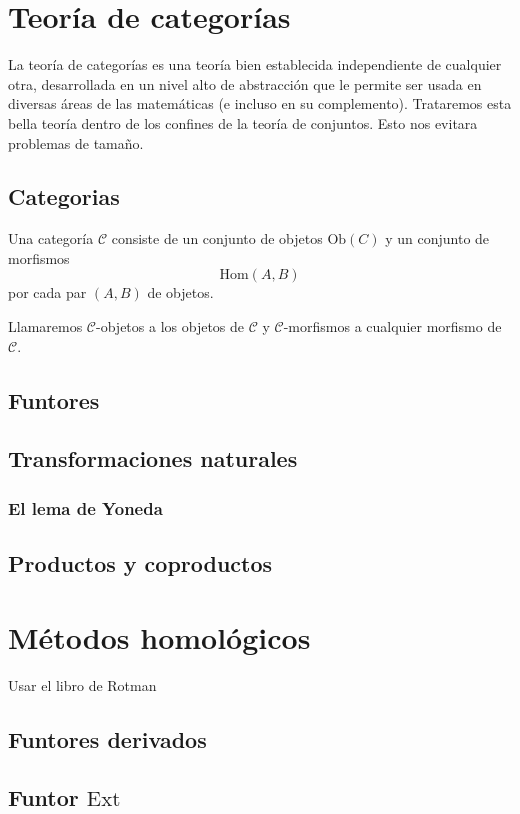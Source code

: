 \documentclass[b5paper,10pt]{book}
\begin{document}
\chapter{Teoría de categorías}

La teoría de categorías 
es una teoría bien establecida 
independiente de cualquier otra,
desarrollada en un nivel alto de abstracción
que le permite ser usada en diversas áreas 
de las matemáticas (e incluso en su complemento).
Trataremos esta bella teoría dentro de los confines
de la teoría de conjuntos.
Esto nos evitara problemas de tamaño.

\section{Categorias}

\begin{defi}
Una categoría \(\mathcal{C}\) consiste de un conjunto de objetos
\(\mathrm{Ob}(C)\) y un conjunto de morfismos
\[
\mathrm{Hom}(A,B)
\]
por cada par \((A,B)\) de objetos.
\end{defi}

Llamaremos \(\mathcal{C}\)-objetos a los 
objetos de \(\mathcal{C}\) y \(\mathcal{C}\)-morfismos a 
cualquier morfismo de \(\mathcal{C}\).

\section{Funtores}
\section{Transformaciones naturales}


\subsection{El lema de Yoneda}

\section{Productos y coproductos}

\chapter{Métodos homológicos}
Usar el libro de Rotman

\section{Funtores derivados}

\section{Funtor \(\mathrm{Ext}\)}
\end{document}
